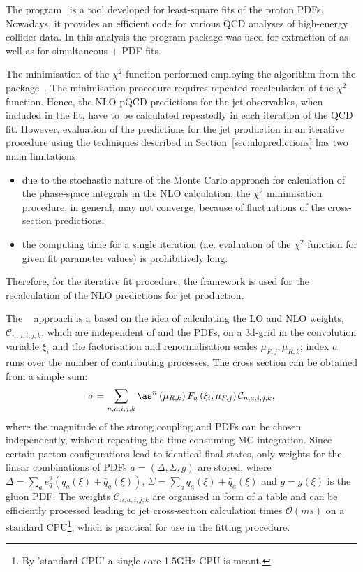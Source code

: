 The \herafitter program~\cite{Aaron:2009aa,Aaron:2009kv} is a tool developed for least-square fits of the proton PDFs. Nowadays, it provides an efficient code for various QCD analyses of high-energy collider data. In this analysis the \herafitter program package was used for extraction of \as as well as for simultaneous \as+ PDF fits.

The minimisation of the $\chi^2$-function performed employing the \migrad algorithm from the \minuit package~\cite{James:1975dr}. The minimisation procedure requires repeated recalculation of the $\chi^2$-function. Hence, the NLO pQCD predictions for the jet observables, when included in the fit, have to be calculated repeatedly in each iteration of the QCD fit. However, evaluation of the predictions for the jet production in an iterative procedure using the techniques described in Section~\ref{sec:nlopredictions} has two main limitations: 
\begin{itemize}
 \item due to the stochastic nature of the Monte Carlo approach for calculation of the phase-space integrals in the NLO calculation, the $\chi^2$ minimisation procedure, in general, may not converge, because of fluctuations of the cross-section predictions;
 \item the computing time for a single iteration (i.e. evaluation of the $\chi^2$ function for given fit parameter values) is prohibitively long.
\end{itemize}
Therefore, for the iterative fit procedure, the \fastnlo framework is used for the recalculation of the NLO predictions for jet production. 

The \fastnlo~\cite{thesis:wobisch:2001,Kluge:2006,Wobisch:2011,Britzger:2012} approach is a based on the idea of calculating the LO and NLO weights, $\mathcal{C}_{n,a,i,j,k}$, which are independent of \as and the PDFs, on a 3d-grid in the convolution variable $\xi_i$ and the factorisation and renormalisation scales $\mu_{F,j}, \mu_{R,k}$; index $a$ runs over the number of contributing processes. The cross section can be obtained from a simple sum:
\begin{equation}
\sigma = \sum_{n,a,i,j,k}{ \as^n\left( \mu_{R,k} \right) F_a\left( \xi_i, \mu_{F,j}\right)\mathcal{C}_{n,a,i,j,k} },
\end{equation}
where the magnitude of the strong coupling and PDFs can be chosen independently, without repeating the time-consuming MC integration. Since certain parton configurations lead to identical final-states, only weights for the linear combinations of PDFs $a=\left( \Delta, \Sigma, g\right) $ are stored, where $\Delta=\sum_a{e_q^2\left(q_a\left(\xi\right)+\bar{q}_a\left(\xi\right)\right)}$, $\Sigma=\sum_a{q_a\left(\xi\right)+\bar{q}_a\left(\xi\right)}$ and $g=g\left(\xi\right)$ is the gluon PDF. The weights $\mathcal{C}_{n,a,i,j,k}$ are organised in form of a table and can be efficiently processed leading to jet cross-section calculation times $\mathcal{O}\left( ms\right)$ on a standard CPU\footnote{By 'standard CPU' a single core 1.5GHz CPU is meant.}, which is practical for use in the fitting procedure.

